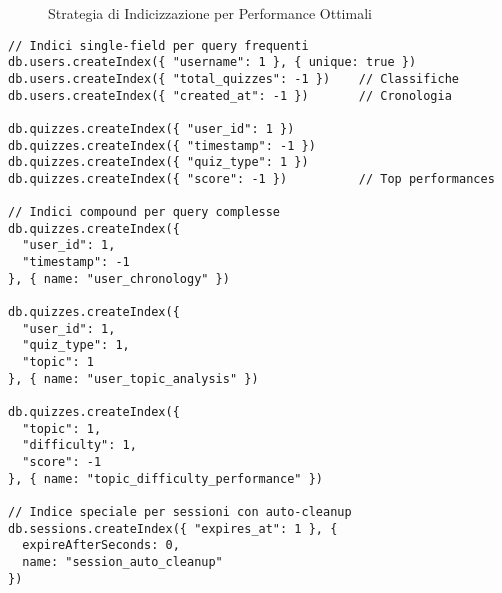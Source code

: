 \documentclass[12pt,a4paper]{article}
\begin{document}
\begin{figure}[H]
\centering
{}
\caption{Strategia di Indicizzazione per Performance Ottimali}
\label{fig:indexing-strategy}
\end{figure}

\begin{lstlisting}[style=mongostyle, caption=Implementazione degli Indici MongoDB]
// Indici single-field per query frequenti
db.users.createIndex({ "username": 1 }, { unique: true })
db.users.createIndex({ "total_quizzes": -1 })    // Classifiche
db.users.createIndex({ "created_at": -1 })       // Cronologia

db.quizzes.createIndex({ "user_id": 1 })
db.quizzes.createIndex({ "timestamp": -1 })
db.quizzes.createIndex({ "quiz_type": 1 })
db.quizzes.createIndex({ "score": -1 })          // Top performances

// Indici compound per query complesse
db.quizzes.createIndex({ 
  "user_id": 1, 
  "timestamp": -1 
}, { name: "user_chronology" })

db.quizzes.createIndex({ 
  "user_id": 1, 
  "quiz_type": 1, 
  "topic": 1 
}, { name: "user_topic_analysis" })

db.quizzes.createIndex({ 
  "topic": 1, 
  "difficulty": 1,
  "score": -1 
}, { name: "topic_difficulty_performance" })

// Indice speciale per sessioni con auto-cleanup
db.sessions.createIndex({ "expires_at": 1 }, { 
  expireAfterSeconds: 0,
  name: "session_auto_cleanup"
})
\end{lstlisting}
\end{document}
